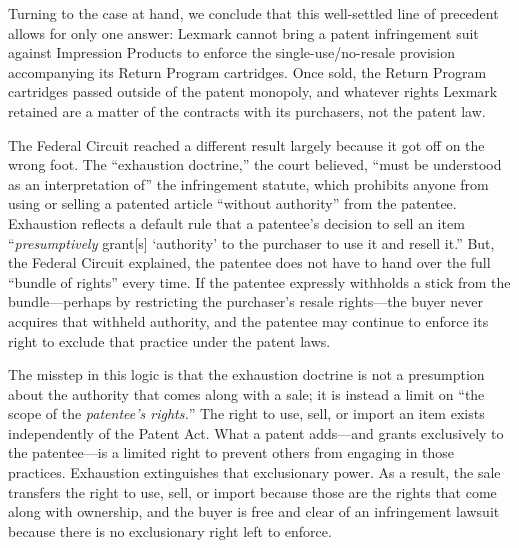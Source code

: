 Turning to the case at hand, we conclude that this well-settled line of
precedent allows for only one answer: Lexmark cannot bring a patent infringement
suit against Impression Products to enforce the single-use/no-resale provision
accompanying its Return Program cartridges. Once sold, the Return Program
cartridges passed outside of the patent monopoly, and whatever rights Lexmark
retained are a matter of the contracts with its purchasers, not the patent law.




The Federal Circuit reached a different result largely because it got off on the
wrong foot. The ``exhaustion doctrine,'' the court believed, ``must be
understood as an interpretation of'' the infringement statute, which prohibits
anyone from using or selling a patented article ``without authority'' from the
patentee. Exhaustion reflects a
default rule that a patentee's decision to sell an item ``\textit{presumptively}
grant[s] `authority' to the purchaser to use it and resell it.''
But, the Federal Circuit explained, the patentee does not have to hand over
the full ``bundle  of rights'' every time.
If the patentee expressly withholds a stick from the
bundle---perhaps by restricting the purchaser's resale rights---the buyer never
acquires that withheld authority, and the patentee may continue to enforce its
right to exclude that practice under the patent laws.

The misstep in this logic is that the exhaustion doctrine is not a presumption
about the authority that comes along with a sale; it is instead a limit on ``the
scope of the \textit{patentee's rights.}''
The right to use, sell, or import an item exists independently of the
Patent Act. What a patent adds---and grants exclusively to the patentee---is a
limited right to prevent others from engaging in those practices.
Exhaustion extinguishes that exclusionary power.
As a result, the sale
transfers the right to use, sell, or import because those are the rights that
come along with ownership, and the buyer is free and clear of an infringement
lawsuit because there is no exclusionary right left to enforce.

